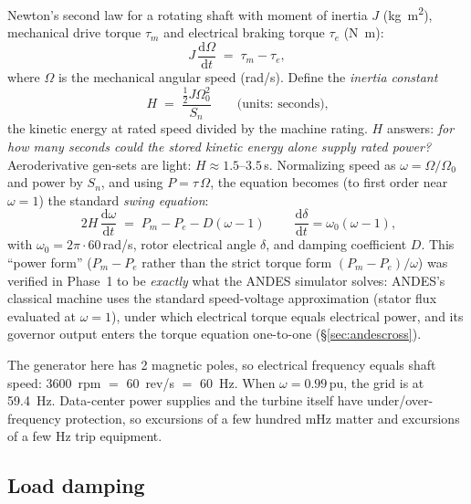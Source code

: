 \documentclass[11pt]{article}
\newcommand{\pu}{\,\text{pu}}
\newcommand{\dd}{\mathrm{d}}
\begin{document}
Newton's second law for a rotating shaft with moment of inertia $J$
(\si{kg.m^2}), mechanical drive torque $\tau_m$ and electrical braking
torque $\tau_e$ (\si{N.m}):
\begin{equation}
  J \,\frac{\dd \Omega}{\dd t} \;=\; \tau_m - \tau_e ,
\end{equation}
where $\Omega$ is the mechanical angular speed (\si{rad/s}). Define the
\emph{inertia constant}
\begin{equation}
  H \;=\; \frac{\tfrac12 J \Omega_0^2}{S_n}
  \qquad \text{(units: seconds),}
  \label{eq:H}
\end{equation}
the kinetic energy at rated speed divided by the machine rating. $H$
answers: \emph{for how many seconds could the stored kinetic energy alone
supply rated power?} Aeroderivative gen-sets are light: $H \approx
1.5$--$3.5$\,s. Normalizing speed as $\omega = \Omega/\Omega_0$ and power
by $S_n$, and using $P = \tau\,\Omega$, the equation becomes (to first
order near $\omega = 1$) the standard \emph{swing equation}:
\begin{equation}
  \boxed{\;2H \,\frac{\dd\omega}{\dd t} \;=\; P_m - P_e - D(\omega - 1)\;}
  \qquad
  \frac{\dd\delta}{\dd t} = \omega_0(\omega - 1),
  \label{eq:swing}
\end{equation}
with $\omega_0 = 2\pi\cdot 60$\,\si{rad/s}, rotor electrical angle
$\delta$, and damping coefficient $D$. This ``power form'' ($P_m - P_e$
rather than the strict torque form $(P_m - P_e)/\omega$) was verified in
Phase~1 to be \emph{exactly} what the ANDES simulator solves: ANDES's
classical machine uses the standard speed-voltage approximation (stator
flux evaluated at $\omega = 1$), under which electrical torque equals
electrical power, and its governor output enters the torque equation
one-to-one (\S\ref{sec:andescross}).

\begin{novicebox}
The generator here has 2 magnetic poles, so electrical frequency equals
shaft speed: \SI{3600}{rpm} $=$ \SI{60}{rev/s} $=$ \SI{60}{Hz}. When
$\omega = 0.99\pu$, the grid is at \SI{59.4}{Hz}. Data-center power
supplies and the turbine itself have under/over-frequency protection, so
excursions of a few hundred mHz matter and excursions of a few Hz trip
equipment.
\end{novicebox}

\subsection{Load damping}
\end{document}
